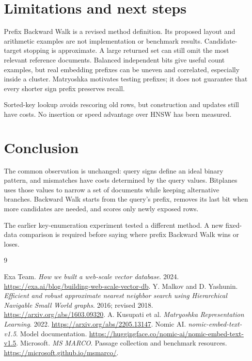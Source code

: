 \section{Limitations and next steps}
Prefix Backward Walk is a revised method definition. Its proposed layout and arithmetic examples are not implementation or benchmark results. Candidate-target stopping is approximate. A large returned set can still omit the most relevant reference documents. Balanced independent bits give useful count examples, but real embedding prefixes can be uneven and correlated, especially inside a cluster. Matryoshka motivates testing prefixes; it does not guarantee that every shorter sign prefix preserves recall.

Sorted-key lookup avoids rescoring old rows, but construction and updates still have costs. No insertion or speed advantage over HNSW has been measured.

\section{Conclusion}
The common observation is unchanged: query signs define an ideal binary pattern, and mismatches have costs determined by the query values. Bitplanes uses those values to narrow a set of documents while keeping alternative branches. Backward Walk starts from the query's prefix, removes its last bit when more candidates are needed, and scores only newly exposed rows.

The earlier key-enumeration experiment tested a different method. A new fixed-data comparison is required before saying where prefix Backward Walk wins or loses.

\begin{thebibliography}{9}\small\raggedright
{} Exa Team. \emph{How we built a web-scale vector database}. 2024.
\url{https://exa.ai/blog/building-web-scale-vector-db}.
 Y. Malkov and D. Yashunin. \emph{Efficient and robust approximate nearest neighbor search using Hierarchical Navigable Small World graphs}. 2016; revised 2018.
\url{https://arxiv.org/abs/1603.09320}.
 A. Kusupati et al. \emph{Matryoshka Representation Learning}. 2022.
\url{https://arxiv.org/abs/2205.13147}.
 Nomic AI. \emph{nomic-embed-text-v1.5}. Model documentation.
\url{https://huggingface.co/nomic-ai/nomic-embed-text-v1.5}.
 Microsoft. \emph{MS MARCO}. Passage collection and benchmark resources.
\url{https://microsoft.github.io/msmarco/}.
\end{thebibliography}
